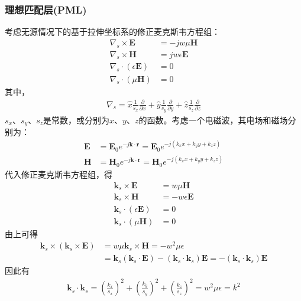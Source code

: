\documentclass{article}
\numberwithin{equation}{section}
\renewcommand{\vec}[1]{\boldsymbol{#1}}
\begin{document}
\subsubsection{理想匹配层(PML)}
考虑无源情况下的基于拉伸坐标系的修正麦克斯韦方程组：
\begin{align}
    \label{eq:eq600}
    \nabla_s \times \mathbf{E}&=-jw\mu\mathbf{H} \\
    \label{eq:eq601}
    \nabla_s \times \mathbf{H}&=jw\epsilon\mathbf{E} \\
    \label{eq:eq602}
    \nabla_s \cdot (\epsilon\mathbf{E})&=0 \\
    \label{eq:eq603}
    \nabla_s \cdot (\mu\mathbf{H})&=0
\end{align}
其中，
\begin{align}
    \label{eq:eq604}
    \nabla_s=\hat{x}\frac{1}{s_x}\frac{\partial}{\partial x}+\hat{y}\frac{1}{s_y}\frac{\partial}{\partial y}+\hat{z}\frac{1}{s_z}\frac{\partial}{\partial z}
\end{align}
$s_x$、$s_y$、$s_z$是常数，或分别为$x$、$y$、$z$的函数。考虑一个电磁波，其电场和磁场分别为：
\begin{align}
    \label{eq:eq605}
    \mathbf{E}&=\mathbf{E}_0e^{-j\vec{k}\cdot\vec{r}}=\mathbf{E}_0e^{-j(k_xx+k_yy+k_zz)} \\
    \label{eq:eq606}
    \mathbf{H}&=\mathbf{H}_0e^{-j\vec{k}\cdot\vec{r}}=\mathbf{H}_0e^{-j(k_xx+k_yy+k_zz)}
\end{align}
代入修正麦克斯韦方程组，得
\begin{align}
    \label{eq:eq607}
    \vec{k}_s \times \mathbf{E}&=w\mu\mathbf{H} \\
    \label{eq:eq608}
    \vec{k}_s \times \mathbf{H}&=-w\epsilon\mathbf{E} \\
    \label{eq:eq609}
    \vec{k}_s \cdot (\epsilon\mathbf{E})&=0 \\
    \label{eq:eq610}
    \vec{k}_s \cdot (\mu\mathbf{H})&=0
\end{align}
由上可得
\begin{align}
    \label{eq:eq611}
    \vec{k}_s \times(\vec{k}_s \times \mathbf{E})&=w\mu\vec{k}_s \times \mathbf{H}=-w^2\mu\epsilon \nonumber \\
                                                 &=\vec{k}_s(\vec{k}_s\cdot\mathbf{E})-(\vec{k}_s\cdot\vec{k}_s)\mathbf{E}=-(\vec{k}_s\cdot\vec{k}_s)\mathbf{E}
\end{align}
因此有
\begin{align}
    \label{eq:eq612}
    \vec{k}_s\cdot\vec{k}_s=\left(\frac{k_x}{s_x}\right)^2+\left(\frac{k_y}{s_y}\right)^2+\left(\frac{k_z}{s_z}\right)^2=w^2\mu\epsilon=k^2
\end{align}
\end{document}
